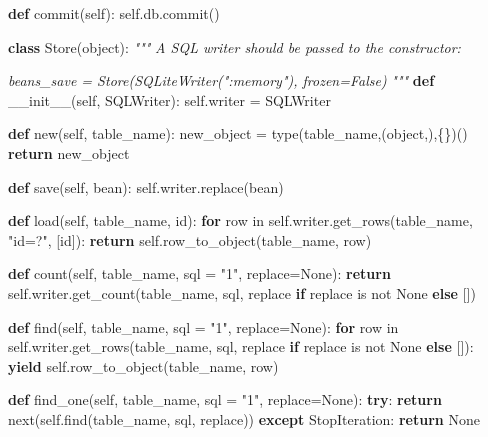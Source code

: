 \documentclass[]{article}
\newenvironment{Shaded}{}{}
\newcommand{\KeywordTok}[1]{\textcolor[rgb]{0.00,0.44,0.13}{\textbf{{#1}}}}
\newcommand{\DataTypeTok}[1]{\textcolor[rgb]{0.56,0.13,0.00}{{#1}}}
\newcommand{\StringTok}[1]{\textcolor[rgb]{0.25,0.44,0.63}{{#1}}}
\newcommand{\CommentTok}[1]{\textcolor[rgb]{0.38,0.63,0.69}{\textit{{#1}}}}
\newcommand{\OtherTok}[1]{\textcolor[rgb]{0.00,0.44,0.13}{{#1}}}
\newcommand{\NormalTok}[1]{{#1}}
\begin{document}
\begin{Shaded}
\begin{Highlighting}[]
    \KeywordTok{def} \NormalTok{commit(}\OtherTok{self}\NormalTok{):}
        \OtherTok{self}\NormalTok{.db.commit()}



\KeywordTok{class} \NormalTok{Store(}\DataTypeTok{object}\NormalTok{):}
    \CommentTok{"""}
\CommentTok{    A SQL writer should be passed to the constructor:}

\CommentTok{    beans_save = Store(SQLiteWriter(":memory"), frozen=False)}
\CommentTok{    """}
    \KeywordTok{def} \OtherTok{__init__}\NormalTok{(}\OtherTok{self}\NormalTok{, SQLWriter):}
        \OtherTok{self}\NormalTok{.writer = SQLWriter }
    
    \KeywordTok{def} \NormalTok{new(}\OtherTok{self}\NormalTok{, table_name):}
        \NormalTok{new_object = }\DataTypeTok{type}\NormalTok{(table_name,(}\DataTypeTok{object}\NormalTok{,),\{\})()}
        \KeywordTok{return} \NormalTok{new_object}

    \KeywordTok{def} \NormalTok{save(}\OtherTok{self}\NormalTok{, bean):}
        \OtherTok{self}\NormalTok{.writer.replace(bean)}
    
    \KeywordTok{def} \NormalTok{load(}\OtherTok{self}\NormalTok{, table_name, }\DataTypeTok{id}\NormalTok{):}
        \KeywordTok{for} \NormalTok{row in }\OtherTok{self}\NormalTok{.writer.get_rows(table_name, }\StringTok{"id=?"}\NormalTok{, [}\DataTypeTok{id}\NormalTok{]):}
            \KeywordTok{return} \OtherTok{self}\NormalTok{.row_to_object(table_name, row)}

    \KeywordTok{def} \NormalTok{count(}\OtherTok{self}\NormalTok{, table_name, sql = }\StringTok{"1"}\NormalTok{, replace=}\OtherTok{None}\NormalTok{):}
        \KeywordTok{return} \OtherTok{self}\NormalTok{.writer.get_count(table_name, sql, replace }\KeywordTok{if} \NormalTok{replace is not }\OtherTok{None} \KeywordTok{else} \NormalTok{[])}

    \KeywordTok{def} \NormalTok{find(}\OtherTok{self}\NormalTok{, table_name, sql = }\StringTok{"1"}\NormalTok{, replace=}\OtherTok{None}\NormalTok{):}
        \KeywordTok{for} \NormalTok{row in }\OtherTok{self}\NormalTok{.writer.get_rows(table_name, sql, replace }\KeywordTok{if} \NormalTok{replace is not }\OtherTok{None} \KeywordTok{else} \NormalTok{[]):}
            \KeywordTok{yield} \OtherTok{self}\NormalTok{.row_to_object(table_name, row)}

    \KeywordTok{def} \NormalTok{find_one(}\OtherTok{self}\NormalTok{, table_name, sql = }\StringTok{"1"}\NormalTok{, replace=}\OtherTok{None}\NormalTok{):}
        \KeywordTok{try}\NormalTok{:}
            \KeywordTok{return} \DataTypeTok{next}\NormalTok{(}\OtherTok{self}\NormalTok{.find(table_name, sql, replace))}
        \KeywordTok{except} \OtherTok{StopIteration}\NormalTok{:}
            \KeywordTok{return} \OtherTok{None}


\end{Highlighting}
\end{Shaded}
\end{document}
